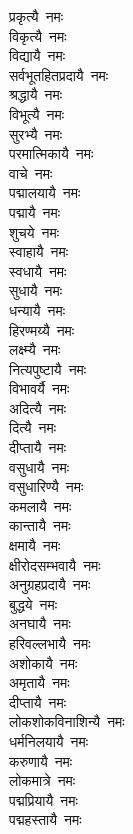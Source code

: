 \begin{multicols}{2}
\begin{flushleft}
प्रकृत्यै~नमः\\
विकृत्यै~नमः\\
विद्यायै~नमः\\
सर्वभूतहितप्रदायै~नमः\\
श्रद्धायै~नमः\\
विभूत्यै~नमः\\
सुरभ्यै~नमः\\
परमात्मिकायै~नमः\\
वाचे~नमः\\
पद्मालयायै~नमः\hfill{}\\
पद्मायै~नमः\\
शुचये~नमः\\
स्वाहायै~नमः\\
स्वधायै~नमः\\
सुधायै~नमः\\
धन्यायै~नमः\\
हिरण्मय्यै~नमः\\
लक्ष्म्यै~नमः\\
नित्यपुष्टायै~नमः\\
विभावर्यै~नमः\hfill{}\\
अदित्यै~नमः\\
दित्यै~नमः\\
दीप्तायै~नमः\\
वसुधायै~नमः\\
वसुधारिण्यै~नमः\\
कमलायै~नमः\\
कान्तायै~नमः\\
क्षमायै~नमः\\
क्षीरोदसम्भवायै~नमः\\
अनुग्रहप्रदायै~नमः\hfill{}\\
बुद्धये~नमः\\
अनघायै~नमः\\
हरिवल्लभायै~नमः\\
अशोकायै~नमः\\
अमृतायै~नमः\\
दीप्तायै~नमः\\
लोकशोकविनाशिन्यै~नमः\\
धर्मनिलयायै~नमः\\
करुणायै~नमः\\
लोकमात्रे~नमः\hfill{}\\
पद्मप्रियायै~नमः\\
पद्महस्तायै~नमः\\

\end{flushleft}
\end{multicols}
